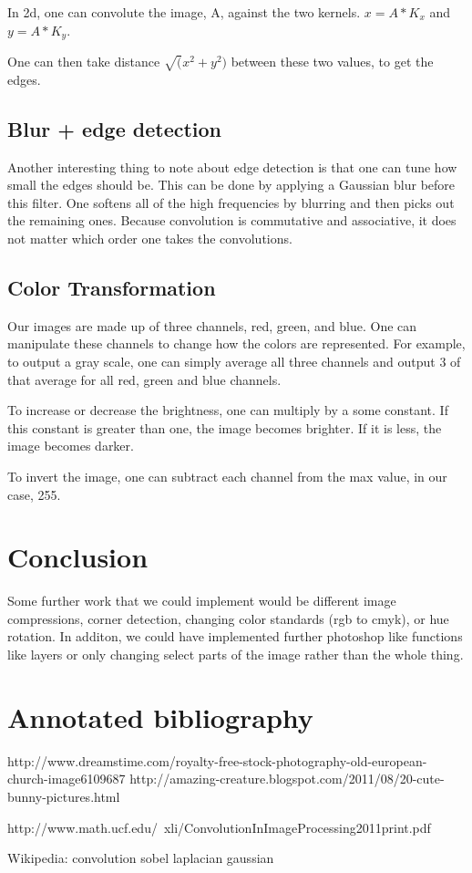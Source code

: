 \documentclass[11pt]{article}
\begin{document}
In 2d, one can convolute the image, A, against the two kernels. $x = A*K_x$ and $y=A*K_y$. 

One can then take distance $\sqrt(x^2+y^2)$ between these two values, to get the edges. 


\subsection{Blur + edge detection}
Another interesting thing to note about edge detection is that one can tune how small the edges should be. This can be done by applying a Gaussian blur before this filter. One softens all of the high frequencies by blurring and then picks out the remaining ones. 
Because convolution is commutative and associative, it does not matter which order one takes the convolutions.

\subsection{Color Transformation}
Our images are made up of three channels, red, green, and blue. One can manipulate these channels to change how the colors are represented. For example, to output a gray scale, one can simply average all three channels and output 3 of that average for all red, green and blue channels.

To increase or decrease the brightness, one can multiply by a some constant. If this constant is greater than one, the image becomes brighter. If it is less, the image becomes darker. 

To invert the image, one can subtract each channel from the max value, in our case, 255.





\section{Conclusion}
Some further work that we could implement would be different image compressions, corner detection, changing color standards (rgb to cmyk), or hue rotation. In additon, we could have implemented further photoshop like
functions like layers or only changing select parts of the image rather than the whole thing.

\section{Annotated bibliography}
http://www.dreamstime.com/royalty-free-stock-photography-old-european-church-image6109687
http://amazing-creature.blogspot.com/2011/08/20-cute-bunny-pictures.html

http://www.math.ucf.edu/~xli/ConvolutionInImageProcessing2011print.pdf

Wikipedia:
convolution
sobel
laplacian
gaussian
\end{document}
